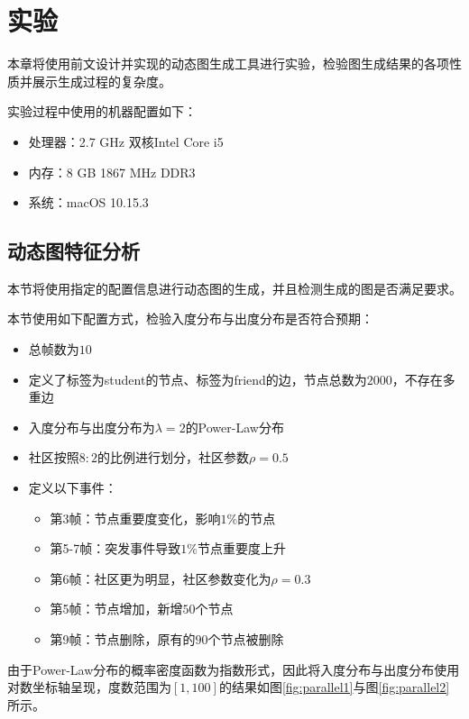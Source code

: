 
\chapter{实验}
\label{cha:chapter05}

本章将使用前文设计并实现的动态图生成工具进行实验，检验图生成结果的各项性质并展示生成过程的复杂度。

实验过程中使用的机器配置如下：

\begin{itemize}
  \item 处理器：2.7 GHz 双核Intel Core i5
  \item 内存：8 GB 1867 MHz DDR3
  \item 系统：macOS 10.15.3
\end{itemize}

\section{动态图特征分析}

本节将使用指定的配置信息进行动态图的生成，并且检测生成的图是否满足要求。

本节使用如下配置方式，检验入度分布与出度分布是否符合预期：

\begin{itemize}
  \item 总帧数为$10$
  \item 定义了标签为student的节点、标签为friend的边，节点总数为$2000$，不存在多重边
  \item 入度分布与出度分布为$\lambda=2$的Power-Law分布
  \item 社区按照$8:2$的比例进行划分，社区参数$\rho=0.5$
  \item 定义以下事件：
  \begin{itemize}
    \item 第3帧：节点重要度变化，影响$1\%$的节点
    \item 第5-7帧：突发事件导致$1\%$节点重要度上升
    \item 第6帧：社区更为明显，社区参数变化为$\rho=0.3$
    \item 第5帧：节点增加，新增$50$个节点
    \item 第9帧：节点删除，原有的$90$个节点被删除
  \end{itemize}
\end{itemize}

由于Power-Law分布的概率密度函数为指数形式，因此将入度分布与出度分布使用对数坐标轴呈现，度数范围为$[1, 100]$的结果如图\ref{fig:parallel1}与图\ref{fig:parallel2}所示。

